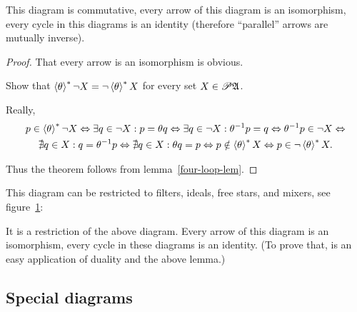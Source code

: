 \begin{thm}
This diagram is commutative, every arrow of this diagram is an isomorphism,
every cycle in this diagrams is an identity (therefore ``parallel''
arrows are mutually inverse).\end{thm}
\begin{proof}
That every arrow is an isomorphism is obvious.

Show that $\left\langle \theta\right\rangle ^{\ast}\lnot X=\lnot\left\langle \theta\right\rangle ^{\ast}X$ for every
set $X\in\mathscr{P}\mathfrak{A}$.

Really,
\begin{multline*}
p\in\left\langle \theta\right\rangle ^{\ast}\lnot X\Leftrightarrow\exists q\in\lnot X:p=\theta q\Leftrightarrow\exists q\in\lnot X:\theta^{-1}p=q\Leftrightarrow\theta^{-1}p\in\lnot X\Leftrightarrow\\
\nexists q\in X:q=\theta^{-1}p\Leftrightarrow\nexists q\in X:\theta q=p\Leftrightarrow p\notin\left\langle \theta\right\rangle ^{\ast}X\Leftrightarrow p\in\lnot\left\langle \theta\right\rangle ^{\ast}X.
\end{multline*}


Thus the theorem follows from lemma~\ref{four-loop-lem}.
\end{proof}
This diagram can be restricted to filters, ideals, free stars, and
mixers, see figure~\ref{theta-flt}:

\begin{figure}[ht]
\caption{\label{theta-flt}}


\end{figure}

\begin{thm}
It is a restriction of the above diagram. Every arrow of this diagram
is an isomorphism, every cycle in these diagrams is an identity. (To
prove that, is an easy application of duality and the above lemma.)
\end{thm}

\subsection{Special diagrams}

